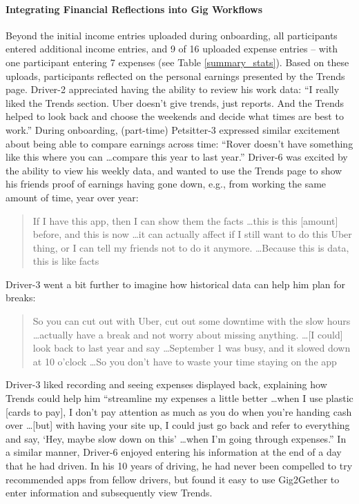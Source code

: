 \paragraph{\textbf{{Integrating Financial Reflections into Gig Workflows}}}
Beyond the initial income entries uploaded during onboarding, all participants entered additional income entries, and 9 of 16 uploaded expense entries {-- with one participant entering 7 expenses (see Table \ref{summary_stats})}. Based on these uploads, participants reflected on the personal earnings presented by the Trends page. Driver-2 appreciated having the ability to review his work data: ``I really liked the Trends section. Uber doesn’t give trends, just reports. And the Trends helped to look back and choose the weekends and decide what times are best to work.'' During onboarding, (part-time) Petsitter-3 expressed similar excitement about being able to compare earnings across time: ``Rover doesn't have something like this where you can \dots compare this year to last year.'' 
Driver-6 was excited by the ability to view his weekly data{, and} wanted to use the Trends page to show his friends proof of earnings having gone down, e.g., from working the same amount of time, year over year:
\begin{quote}
    If I have this app, then I can show them the facts \dots this is this [amount] before, and this is now \dots it can actually affect if I still want to do this Uber thing, or I can tell my friends not to do it anymore. \dots Because this is data, this is like facts 
\end{quote}
Driver-3 went a bit further to imagine how historical data can help him plan for breaks:
\begin{quote}
So you can cut out with Uber, cut out some downtime with the slow hours \dots actually have a break and not worry about missing anything. \dots [I could] look back to last year and say \dots September 1 was busy, and it slowed down at 10 o'clock \dots So you don't have to waste your time staying on the app    
\end{quote}

Driver-3 liked recording and seeing expenses displayed back, explaining how Trends could help him ``streamline my expenses a little better \dots when I use plastic [cards to pay], I don't pay attention as much as you do when you're handing cash over \dots [but] with having your site up, I could just go back and refer to everything and say, `Hey, maybe slow down on this' \dots when I'm going through expenses.''
In a similar manner, Driver-6 enjoyed entering his information at the end of a day that he had driven. In his 10 years of driving, he had never been compelled to try recommended apps from fellow drivers, but found it easy to use Gig2Gether to enter information and subsequently view Trends.


